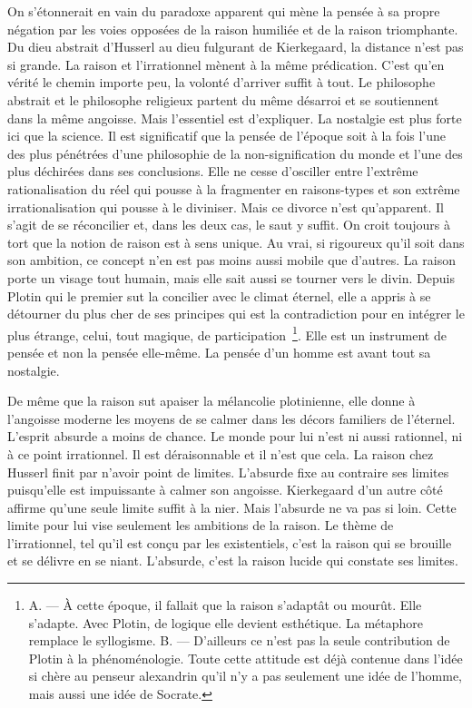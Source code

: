 \documentclass{book}
\begin{document}
On s'étonnerait en vain du paradoxe apparent qui mène la pensée à sa propre négation par les voies opposées de la raison humiliée et de la raison triomphante. Du dieu abstrait d'Husserl au dieu fulgurant de Kierkegaard, la distance n'est pas si grande. La raison et l'irrationnel mènent à la même prédication. C'est qu'en vérité le chemin importe peu, la volonté d'arriver suffit à tout. Le philosophe abstrait et le philosophe religieux partent du même désarroi et se soutiennent dans la même angoisse. Mais l'essentiel est d'expliquer. La nostalgie est plus forte ici que la science. Il est significatif que la pensée de l'époque soit à la fois l'une des plus pénétrées d'une philosophie de la non-signification du monde et l'une des plus déchirées dans ses conclusions. Elle ne cesse d'osciller entre l'extrême rationalisation du réel qui pousse à la fragmenter en raisons-types et son extrême irrationalisation qui pousse à le diviniser. Mais ce divorce n'est qu'apparent. Il s'agit de se réconcilier et, dans les deux cas, le saut y suffit. On croit toujours à tort que la notion de raison est à sens unique. Au vrai, si rigoureux qu'il soit dans son ambition, ce concept n'en est pas moins aussi mobile que d'autres. La raison porte un visage tout humain, mais elle sait aussi se tourner vers le divin. Depuis Plotin qui le premier sut la concilier avec le climat éternel, elle a appris à se détourner du plus cher de ses principes qui est la contradiction pour en intégrer le plus étrange, celui, tout magique, de participation \footnote{A. — À cette époque, il fallait que la raison s’adaptât ou mourût. Elle s’adapte. Avec Plotin, de logique elle devient esthétique. La métaphore remplace le syllogisme. B. — D’ailleurs ce n’est pas la seule contribution de Plotin à la phénoménologie. Toute cette attitude est déjà contenue dans l’idée si chère au penseur alexandrin qu’il n’y a pas seulement une idée de l’homme, mais aussi une idée de Socrate.}. Elle est un instrument de pensée et non la pensée elle-même. La pensée d'un homme est avant tout sa nostalgie.

De même que la raison sut apaiser la mélancolie plotinienne, elle donne à l'angoisse moderne les moyens de se calmer dans les décors familiers de l'éternel. L'esprit absurde a moins de chance. Le monde pour lui n'est ni aussi rationnel, ni à ce point irrationnel. Il est déraisonnable et il n'est que cela. La raison chez Husserl finit par n'avoir point de limites. L'absurde fixe au contraire ses limites puisqu'elle est impuissante à calmer son angoisse. Kierkegaard d'un autre côté affirme qu'une seule limite suffit à la nier. Mais l'absurde ne va pas si loin. Cette limite pour lui vise seulement les ambitions de la raison. Le thème de l'irrationnel, tel qu'il est conçu par les existentiels, c'est la raison qui se brouille et se délivre en se niant. L'absurde, c'est la raison lucide qui constate ses limites.
\end{document}
